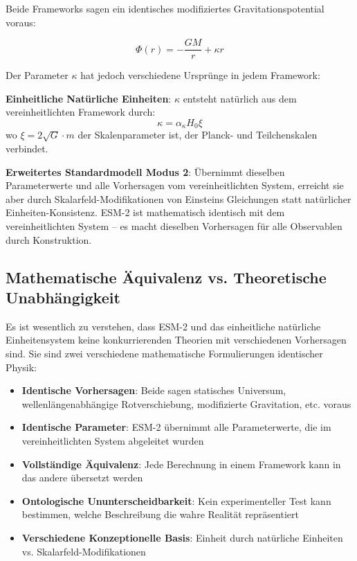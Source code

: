 \documentclass[12pt,a4paper]{article}
\newcommand{\xipar}{\xi}
\begin{document}
	Beide Frameworks sagen ein identisches modifiziertes Gravitationspotential voraus:
	
	\begin{equation}
		\Phi(r) = -\frac{GM}{r} + \kappa r
	\end{equation}
	
	Der Parameter $\kappa$ hat jedoch verschiedene Ursprünge in jedem Framework:
	
	\textbf{Einheitliche Natürliche Einheiten}: $\kappa$ entsteht natürlich aus dem vereinheitlichten Framework durch:
	\begin{equation}
		\kappa = \alpha_\kappa H_0 \xipar
	\end{equation}
	wo $\xipar = 2\sqrt{G} \cdot m$ der Skalenparameter ist, der Planck- und Teilchenskalen verbindet.
	
	\textbf{Erweitertes Standardmodell Modus 2}: Übernimmt dieselben Parameterwerte und alle Vorhersagen vom vereinheitlichten System, erreicht sie aber durch Skalarfeld-Modifikationen von Einsteins Gleichungen statt natürlicher Einheiten-Konsistenz. ESM-2 ist mathematisch identisch mit dem vereinheitlichten System – es macht dieselben Vorhersagen für alle Observablen durch Konstruktion.
	
	\subsection{Mathematische Äquivalenz vs. Theoretische Unabhängigkeit}
	\label{subsec:equivalence_vs_independence}
	
	Es ist wesentlich zu verstehen, dass ESM-2 und das einheitliche natürliche Einheitensystem keine konkurrierenden Theorien mit verschiedenen Vorhersagen sind. Sie sind zwei verschiedene mathematische Formulierungen identischer Physik:
	
	\begin{itemize}
		\item \textbf{Identische Vorhersagen}: Beide sagen statisches Universum, wellenlängenabhängige Rotverschiebung, modifizierte Gravitation, etc. voraus
		\item \textbf{Identische Parameter}: ESM-2 übernimmt alle Parameterwerte, die im vereinheitlichten System abgeleitet wurden
		\item \textbf{Vollständige Äquivalenz}: Jede Berechnung in einem Framework kann in das andere übersetzt werden
		\item \textbf{Ontologische Ununterscheidbarkeit}: Kein experimenteller Test kann bestimmen, welche Beschreibung die wahre Realität repräsentiert
		\item \textbf{Verschiedene Konzeptionelle Basis}: Einheit durch natürliche Einheiten vs. Skalarfeld-Modifikationen
	\end{itemize}
	
\end{document}
